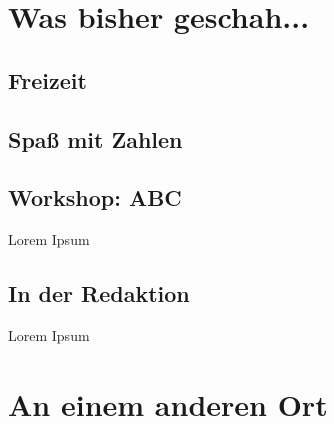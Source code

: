 
%



%


\multiauthor{}






%



\makemultititle
%

\section{Was bisher geschah...}

\subsection{Freizeit}

\subsection{Spaß mit Zahlen}

\subsection{Workshop: ABC}
Lorem Ipsum

\subsection{In der Redaktion}
Lorem Ipsum

\section{An einem anderen Ort}


